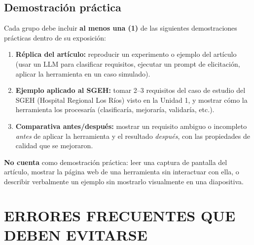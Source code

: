 \documentclass[11pt,a4paper]{article}
\begin{document}
	\subsection{Demostración práctica}
	
	Cada grupo debe incluir \textbf{al menos una (1)} de las siguientes demostraciones prácticas dentro de su exposición:
	
	\begin{enumerate}[leftmargin=18pt, itemsep=4pt, label=\alph*)]
		\item \textbf{Réplica del artículo:} reproducir un experimento o ejemplo del artículo (usar un LLM para clasificar requisitos, ejecutar un prompt de elicitación, aplicar la herramienta en un caso simulado).
		\item \textbf{Ejemplo aplicado al SGEH:} tomar 2--3 requisitos del caso de estudio del SGEH (Hospital Regional Los Ríos) visto en la Unidad 1, y mostrar cómo la herramienta los procesaría (clasificaría, mejoraría, validaría, etc.).
		\item \textbf{Comparativa antes/después:} mostrar un requisito ambiguo o incompleto \textit{antes} de aplicar la herramienta y el resultado \textit{después}, con las propiedades de calidad que se mejoraron.
	\end{enumerate}
	
	\begin{alertbox}
		\textbf{No cuenta} como demostración práctica: leer una captura de pantalla del artículo, mostrar la página web de una herramienta sin interactuar con ella, o describir verbalmente un ejemplo sin mostrarlo visualmente en una diapositiva.
	\end{alertbox}
	
	\section{ERRORES FRECUENTES QUE DEBEN EVITARSE}
	
\end{document}
